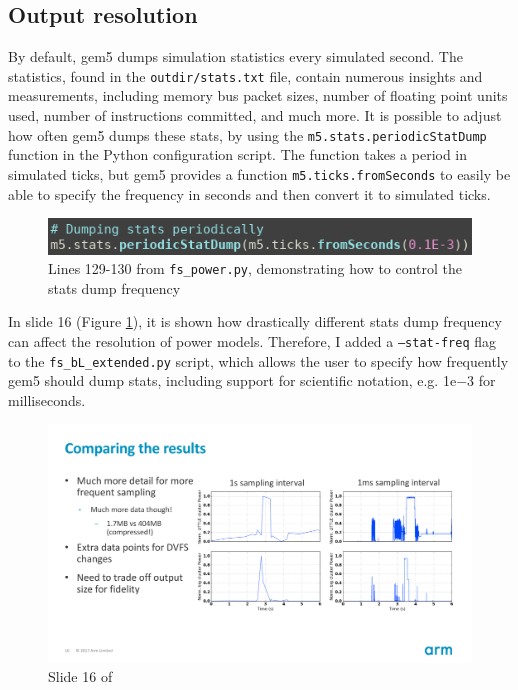     \subsection{Output resolution}
    By default, gem5 dumps simulation statistics every simulated second. The 
    statistics, found in the \texttt{outdir/stats.txt} file, contain numerous 
    insights and measurements, including memory bus packet sizes, number of 
    floating point units used, number of instructions committed, and much more. 
    It is possible to adjust how often gem5 dumps these stats, by using the 
    \texttt{m5.stats.periodicStatDump} function in the Python configuration 
    script. The function takes a period in simulated ticks, but gem5 provides a 
    function \texttt{m5.ticks.fromSeconds} to easily be able to specify the 
    frequency in seconds and then convert it to simulated ticks.
    \begin{figure}[H]
        \centering
        \includegraphics[width=0.6\linewidth]{screenshots/config-exts/periodic-dump-stats.png}
        \caption{Lines 129-130 from \texttt{fs\_power.py}, demonstrating how to 
                 control the stats dump frequency}
    \end{figure}
    In \cite{bischoff_gem5_2017-1} slide 16 (Figure 
    \ref{fig:bischoff-gem5-s16}), it is shown how drastically different stats 
    dump frequency can affect the resolution of power models. Therefore, I 
    added a \texttt{--stat-freq} flag to the \texttt{fs\_bL\_extended.py} 
    script, which allows the user to specify how frequently gem5 should dump 
    stats, including support for scientific notation, e.g. {\sffamily 1e$-$3} 
    for milliseconds.
    \begin{figure}[H]
        \centering
        \includegraphics[width=0.9\linewidth]{screenshots/empowering-the-masses-s16.png}
        \caption{Slide 16 of \cite{bischoff_gem5_2017-1}}
        \label{fig:bischoff-gem5-s16}
    \end{figure}
